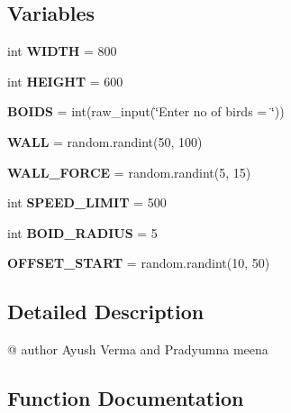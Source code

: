 \subsection*{Variables}
\begin{DoxyCompactItemize}
\item 
\mbox{\label{namespacett_aa05f5515b8e5c6932c8815e73048ff17}} 
int {\bfseries W\+I\+D\+TH} = 800
\item 
\mbox{\label{namespacett_ae0fd4b4801faca8b0b57a3f5fc83a4bc}} 
int {\bfseries H\+E\+I\+G\+HT} = 600
\item 
\mbox{\label{namespacett_a3dd5266ad6d3a42161acbdc9c853c3fe}} 
{\bfseries B\+O\+I\+DS} = int(raw\+\_\+input(\char`\"{}Enter no of birds = \char`\"{}))
\item 
\mbox{\label{namespacett_a90fb2f58c2118cb992622614ebb50ee2}} 
{\bfseries W\+A\+LL} = random.\+randint(50, 100)
\item 
\mbox{\label{namespacett_a7173c3727687761a8e2d4a2d2585d11f}} 
{\bfseries W\+A\+L\+L\+\_\+\+F\+O\+R\+CE} = random.\+randint(5, 15)
\item 
\mbox{\label{namespacett_a62550ef786581c4acd43dc0b69fbca0d}} 
int {\bfseries S\+P\+E\+E\+D\+\_\+\+L\+I\+M\+IT} = 500
\item 
\mbox{\label{namespacett_acc77fb7e0437bae134d5dea38da83b6a}} 
int {\bfseries B\+O\+I\+D\+\_\+\+R\+A\+D\+I\+US} = 5
\item 
\mbox{\label{namespacett_a84ceeff3815b12f4708bf7797413b7d0}} 
{\bfseries O\+F\+F\+S\+E\+T\+\_\+\+S\+T\+A\+RT} = random.\+randint(10, 50)
\end{DoxyCompactItemize}


\subsection{Detailed Description}
\begin{DoxyVerb}    @ author Ayush Verma and Pradyumna meena
\end{DoxyVerb}
 

\subsection{Function Documentation}
\mbox{\label{namespacett_a78b2b453f72a7691f0d677d157f53378}} 
